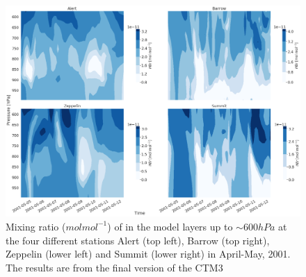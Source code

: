 \begin{figure}[ht]
    \centering
    \includegraphics[width = \linewidth]{Chapter6_Results/images/vertHBr_step4.png}
    \caption{Mixing ratio ($mol mol^{-1}$) of  in the model layers up to $\sim 600 hPa$ at the four different stations Alert (top left), Barrow (top right), Zeppelin (lower left) and Summit (lower right) in April-May, 2001. The results are from the final version of the CTM3}
    \label{fig:vertHBr_step4}
\end{figure}